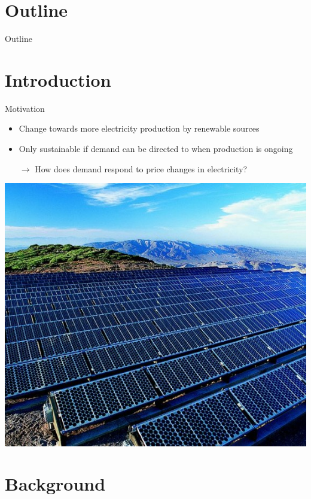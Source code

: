 


\maketitle


\section{Outline}
\begin{frame}{Outline}
\tableofcontents
\end{frame}


\section{Introduction}

\begin{frame}{Motivation}
\begin{multicols}{2}
\begin{itemize}
    \item Change towards more electricity production by renewable sources
    \item Only sustainable if demand can be directed to when production is ongoing
    \item[$\rightarrow$] How does demand respond to price changes in electricity?
\end{itemize}
\vfill\null\columnbreak
\includegraphics[width=0.5 \textwidth]{graphics/solar_panels}
\end{multicols}
\end{frame}


\section{Background}

